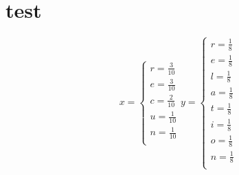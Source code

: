 \documentclass[a4paper,10pt,titlepage]{report}
\begin{document}
\section{test}
\begin{equation}
    x = \begin{cases}
                  r = \frac{3}{10}\\
                  e = \frac{3}{10}\\
                  c = \frac{2}{10}\\
                  u = \frac{1}{10}\\
                  n = \frac{1}{10}\\
        \end{cases}
     y =  \begin{cases}
                  r = \frac{1}{8}\\
                  e = \frac{1}{8}\\
                  l = \frac{1}{8}\\
                  a = \frac{1}{8}\\
                  t = \frac{1}{8}\\
                  i = \frac{1}{8}\\
                  o = \frac{1}{8}\\
                  n = \frac{1}{8}\\
            \end{cases}
\end{equation}  
  
\end{document}
